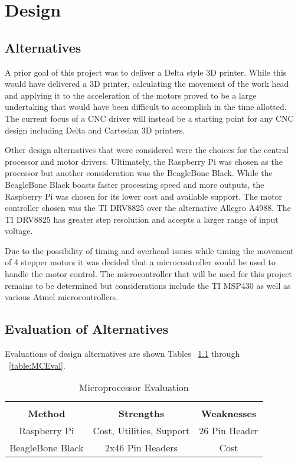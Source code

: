 \chapter{Design}
\section{Alternatives}
A prior goal of this project was to deliver a Delta style 3D printer. While this would have delivered a 3D printer, calculating the movement of the work head and applying it to the acceleration of the motors proved to be a large undertaking that would have been difficult to accomplish in the time allotted. The current focus of a CNC driver will instead be a starting point for any CNC design including Delta and Cartesian 3D printers.

Other design alternatives that were considered were the choices for the central processor and motor drivers. Ultimately, the Raspberry Pi was chosen as the processor but another consideration was the BeagleBone Black. While the BeagleBone Black boasts faster processing speed and more outputs, the Raspberry Pi was chosen for its lower cost and available support. The motor controller chosen was the TI DRV8825 over the alternative Allegro A4988. The TI DRV8825 has greater step resolution and accepts a larger range of input voltage.

Due to the possibility of timing and overhead issues while timing the movement of 4 stepper motors it was decided that a microcontroller would be used to handle the motor control. The microcontroller that will be used for this project remains to be determined but considerations include the TI MSP430 as well as various Atmel microcontrollers.
\section{Evaluation of Alternatives}
Evaluations of design alternatives are shown Tables ~\ref{table:uPEval} through ~\ref{table:MCEval}.

\begin{table}[ht]
	\caption{Microprocessor Evaluation}
	\label{table:uPEval}
	\centering
	\begin{tabular}{c c c}
	\hline \hline \\
		\textbf{Method} & \textbf{Strengths} & \textbf{Weaknesses}\\
		Raspberry Pi & Cost, Utilities, Support & 26 Pin Header\\
		BeagleBone Black & 2x46 Pin Headers & Cost\\
	\end{tabular}
\end{table}


